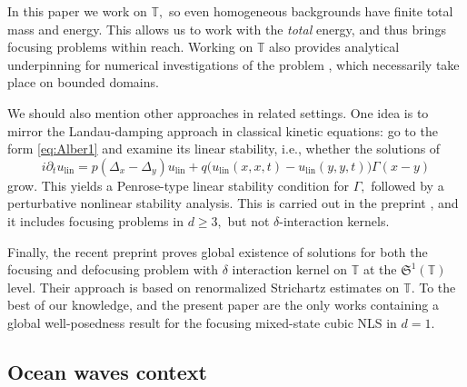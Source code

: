 \documentclass[11pt]{amsart}
\theoremstyle{definition}
\newcommand{\T}{\mathbb{T}}
\newcommand{\Sp}{\mathfrak{S}}
\begin{document}
In this paper we work on $\T,$ so even homogeneous backgrounds have finite total mass and  energy. This allows us to work with the {\em total} energy, and thus brings focusing problems within reach. Working on $\T$ also provides analytical underpinning for numerical investigations of the problem \cite{AthanassoulisKarakatsaniKyza2025,RibalBabaninYoungToffoliStiassnie2013,StiassnieRegevAgnon2008}, which necessarily take place on bounded domains. 
\medskip 

We should also mention
other approaches in related settings. One idea is to mirror the Landau-damping approach in classical kinetic equations: go to the form \eqref{eq:Alber1} and examine its linear stability, i.e., whether the solutions of
\begin{equation}\label{eq:Alber1lin}
  i\partial_t u_{\mathrm{lin}} = p(\Delta_x - \Delta_y)u_{\mathrm{lin}}
  + q\bigl(u_{\mathrm{lin}}(x,x,t)-u_{\mathrm{lin}}(y,y,t)\bigr) \Gamma(x-y)
\end{equation}
grow. This yields a Penrose-type linear stability condition for $\Gamma,$ followed by a perturbative nonlinear stability analysis. This is carried out in the preprint \cite{Smith2024}, and it includes focusing problems in $d\ge 3,$ but not $\delta$-interaction kernels. %

Finally, the recent preprint \cite{HadamaRout2026} proves global existence of solutions for both the focusing and defocusing problem with $\delta$ interaction kernel on $\T$ at the $\Sp^1(\T)$ level. Their approach is based on renormalized Strichartz estimates on $\T.$ %
To the best of our knowledge, \cite{HadamaRout2026} and the present paper are the only works containing a global well-posedness result for the focusing mixed-state cubic NLS in $d=1.$





\subsection{Ocean waves context}\label{subsec:ocean}
\end{document}
